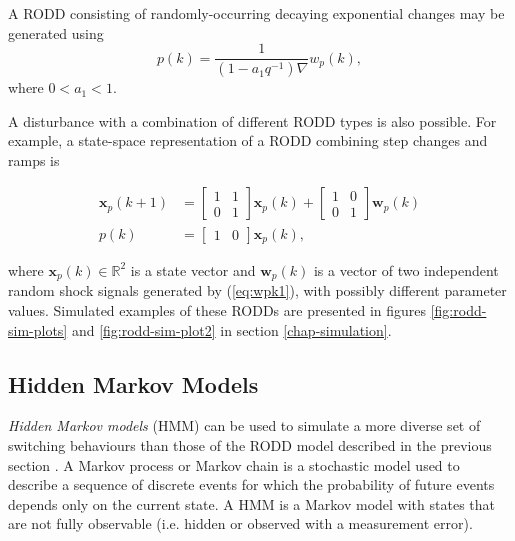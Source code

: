 A RODD consisting of randomly-occurring decaying exponential changes may be generated using
\begin{equation} \label{eq:RODD-exp}
	p(k)= \frac{1}{(1-a_1q^{-1})\nabla}w_p(k),
\end{equation}
where  $0<a_1<1$.

A disturbance with a combination of different RODD types is also possible.  For example, a state-space representation of a RODD combining step changes and ramps is

\begin{equation} \label{eq:RODD-step-ramp}
	\begin{split}
		\mathbf{x}_p(k+1) & =\left[\begin{array}{cc}
			1 & 1 \\
			0 & 1
		\end{array}\right] \mathbf{x}_p(k) +\left[\begin{array}{cc}
			1 & 0 \\
			0 & 1
		\end{array}\right] \mathbf{w}_p(k) \\
		p(k) & =\left[\begin{array}{cc}
			1 & 0
		\end{array}\right] \mathbf{x}_p(k),
	\end{split}
\end{equation}

where $\mathbf{x}_p(k) \in \mathbb{R}^2$ is a state vector and $\mathbf{w}_p(k)$ is a vector of two independent random shock signals generated by (\ref{eq:wpk1}), with possibly different parameter values. Simulated examples of these RODDs are presented in figures \ref{fig:rodd-sim-plots} and \ref{fig:rodd-sim-plot2} in section \ref{chap-simulation}.

\subsection{Hidden Markov Models}

\textit{Hidden Markov models} (HMM) can be used to simulate a more diverse set of switching behaviours than those of the RODD model described in the previous section \citep{wong_realistic_2009}. A Markov process or Markov chain is a stochastic model used to describe a sequence of discrete events for which the probability of future events depends only on the current state. A HMM is a Markov model with states that are not fully observable (i.e. hidden or observed with a measurement error).

